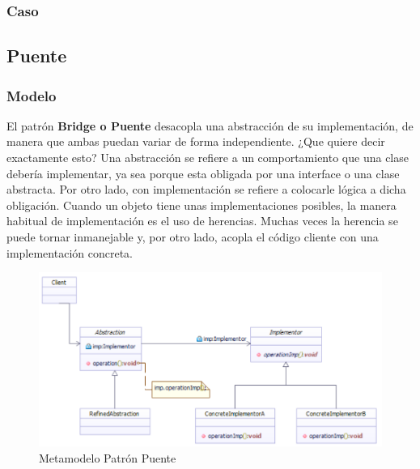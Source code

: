 \subsubsection{Caso}
\newpage


\subsection{Puente}
	
\subsubsection{Modelo}

El patrón \textbf{Bridge o Puente} desacopla una abstracción de su implementación, de manera que ambas puedan variar de forma independiente. ¿Que quiere decir exactamente esto? Una abstracción se refiere a un comportamiento que una clase debería implementar, ya sea porque esta obligada por una interface o una clase abstracta. Por otro lado, con implementación se refiere a colocarle lógica a dicha obligación. Cuando un objeto tiene unas implementaciones posibles, la manera habitual de implementación es el uso de herencias. Muchas veces la herencia se puede tornar inmanejable y, por otro lado, acopla el código cliente con una implementación concreta. 

\begin{figure}[th!]
	\centering
	\includegraphics[width=1\linewidth]{arquitectura/imagenes/modeloPuente}
	\caption{Metamodelo Patrón Puente}
	\label{fig:metamodelo puente}
\end{figure}

